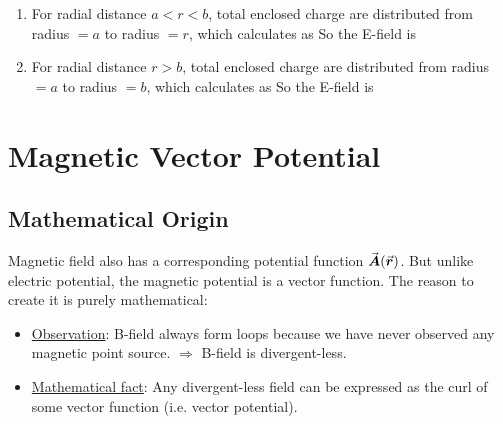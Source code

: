 \documentclass[class=article, crop=false, 12pt]{standalone}
\begin{document}
\begin{example}
\begin{enumerate}

        \item For radial distance $a<r<b$, 
        total enclosed charge are distributed from radius $=a$ to radius $=r$,
        which calculates as
        So the E-field is
        

        \item For radial distance $r>b$,
        total enclosed charge are distributed from radius $=a$ to radius $=b$,
        which calculates as
        So the E-field is


    \end{enumerate}

\end{example}



\linesep
\section{Magnetic Vector Potential}

\subsection{Mathematical Origin}

Magnetic field also has a corresponding potential function $\va*{A}(\va*{r})$.
But unlike electric potential,
the magnetic potential is a vector function. 
The reason to create it is purely mathematical:
\begin{itemize}
    \item \ul{Observation}: 
    B-field always form loops because we have never observed any magnetic point source.
    $\Rightarrow$ B-field is divergent-less.

    \item \ul{Mathematical fact}: 
    Any divergent-less field can be expressed as the curl of some vector function (i.e. vector potential).
\end{itemize}
\end{document}
